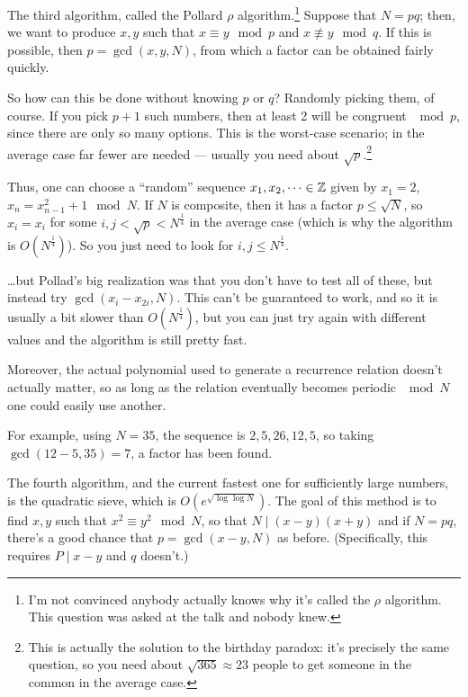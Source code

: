 The third algorithm, called the Pollard $\rho$ algorithm.\footnote{I'm not convinced anybody actually knows why it's called the $\rho$ algorithm. This question was asked at the talk and nobody knew.} Suppose that $N = pq$; then, we want to produce $x,y$ such that $x \equiv y\mod p$ and $x \not\equiv y \mod q$. If this is possible, then $p = \gcd(x,y,N)$, from which a factor can be obtained fairly quickly.

So how can this be done without knowing $p$ or $q$? Randomly picking them, of course. If you pick $p+1$ such numbers, then at least 2 will be congruent $\mod p$, since there are only so many options. This is the worst-case scenario; in the average case far fewer are needed --- usually you need about $\sqrt p$.\footnote{This is actually the solution to the birthday paradox: it's precisely the same question, so you need about $\sqrt{365} \approx 23$ people to get someone in the common in the average case.}

Thus, one can choose a ``random'' sequence $x_1,x_2,\dots\in\mathbb{Z}$ given by $x_1 = 2$, $x_n = x_{n-1}^2 +1 \mod N$. If $N$ is composite, then it has a factor $p\le \sqrt N$, so $x_i=x_i$ for some $i,j < \sqrt p < N^{\frac{1}{4}}$ in the average case (which is why the algorithm is $O(N^{\frac{1}{4}})$). So you just need to look for $i,j\le N^{\frac{1}{4}}$.

\dots but Pollad's big realization was that you don't have to test all of these, but instead try $\gcd(x_i-x_{2i},N)$. This can't be guaranteed to work, and so it is usually a bit slower than $O(N^{\frac{1}{4}})$, but you can just try again with different values and the algorithm is still pretty fast.

Moreover, the actual polynomial used to generate a recurrence relation doesn't actually matter, so as long as the relation eventually becomes periodic $\mod N$ one could easily use another.

For example, using $N = 35$, the sequence is $2,5,26,12,5$, so taking $\gcd(12 - 5,35) = 7$, a factor has been found.

The fourth algorithm, and the current fastest one for sufficiently large numbers, is the quadratic sieve, which is $O\left(e^{\sqrt{\log\log N}}\right)$. The goal of this method is to find $x,y$ such that $x^2\equiv y^2\mod N$, so that $N\mid (x-y)(x+y)$ and if $N = pq$, there's a good chance that $p = \gcd(x-y,N)$ as before. (Specifically, this requires $P \mid x-y$ and $q$ doesn't.)

